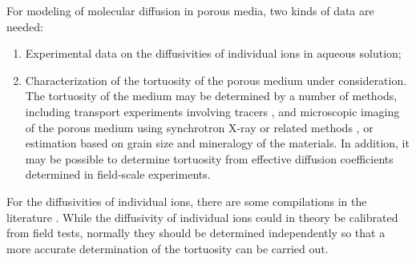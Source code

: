 \noindent For modeling of molecular diffusion in porous media, two kinds of data are needed:
%
\begin{enumerate}
\item  
  Experimental data on the diffusivities of individual ions in aqueous solution;
\item  
  Characterization of the tortuosity of the porous medium under consideration.  
  The tortuosity of the medium may be determined by a number of methods, 
  including transport experiments involving tracers \citep{navarre2009evolution},
  and microscopic imaging of the porous medium using synchrotron X-ray
  or related methods \citep{navarre2009evolution}, or estimation based on grain size and mineralogy of the materials.  
  In addition, it may be possible to determine tortuosity from effective diffusion coefficients determined in field-scale experiments.
\end{enumerate}

\noindent  
For the diffusivities of individual ions, there are some compilations in the literature \citep{lasaga1998kinetic,steefel2009fluid}.  
While the diffusivity of individual ions could in theory be calibrated from field tests, 
normally they should be determined independently so that a more accurate determination of the tortuosity can be carried out.







